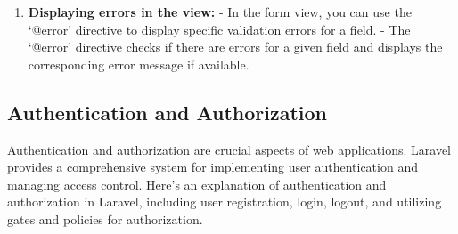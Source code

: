\begin{itemize}
\begin{enumerate}
   \item \textbf{Displaying errors in the view:}
   - In the form view, you can use the `@error' directive to display specific validation errors for a field.
   - The `@error' directive checks if there are errors for a given field and displays the corresponding error message if available.
\end{enumerate} 
\end{itemize}
\subsection{Authentication and Authorization}
Authentication and authorization are crucial aspects of web applications. Laravel provides a comprehensive system for implementing user authentication and managing access control. Here's an explanation of authentication and authorization in Laravel, including user registration, login, logout, and utilizing gates and policies for authorization.
\newpage
